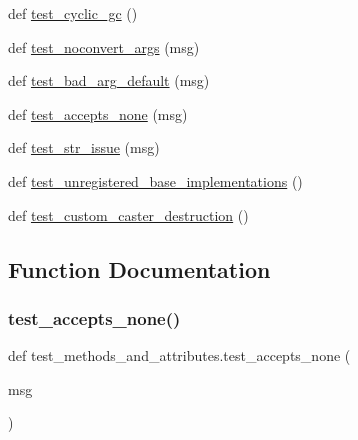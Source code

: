 \begin{DoxyCompactItemize}
def \mbox{\hyperlink{namespacetest__methods__and__attributes_a1faeda1dfc6ea96d020984d3822799fa}{test\+\_\+cyclic\+\_\+gc}} ()
\item 
def \mbox{\hyperlink{namespacetest__methods__and__attributes_a9f306d70c33330329e2b13bba46a31a9}{test\+\_\+noconvert\+\_\+args}} (msg)
\item 
def \mbox{\hyperlink{namespacetest__methods__and__attributes_afc4a511f17ce70f96cc5b99827134cd9}{test\+\_\+bad\+\_\+arg\+\_\+default}} (msg)
\item 
def \mbox{\hyperlink{namespacetest__methods__and__attributes_a7482972c9a03812ec2ffbe2ce6babc7e}{test\+\_\+accepts\+\_\+none}} (msg)
\item 
def \mbox{\hyperlink{namespacetest__methods__and__attributes_ac48f262bd9454cebbab3663a10949873}{test\+\_\+str\+\_\+issue}} (msg)
\item 
def \mbox{\hyperlink{namespacetest__methods__and__attributes_a89e9422a22bb9918e050642ca7a042f0}{test\+\_\+unregistered\+\_\+base\+\_\+implementations}} ()
\item 
def \mbox{\hyperlink{namespacetest__methods__and__attributes_aaa484d9302000016cbd76ecc3edc354e}{test\+\_\+custom\+\_\+caster\+\_\+destruction}} ()
\end{DoxyCompactItemize}


\subsection{Function Documentation}
\mbox{\label{namespacetest__methods__and__attributes_a7482972c9a03812ec2ffbe2ce6babc7e}} 
\subsubsection{\texorpdfstring{test\_accepts\_none()}{test\_accepts\_none()}}
{\footnotesize\ttfamily def test\+\_\+methods\+\_\+and\+\_\+attributes.\+test\+\_\+accepts\+\_\+none (\begin{DoxyParamCaption}\item[{}]{msg }\end{DoxyParamCaption})}

\mbox{\label{namespacetest__methods__and__attributes_afc4a511f17ce70f96cc5b99827134cd9}} 
